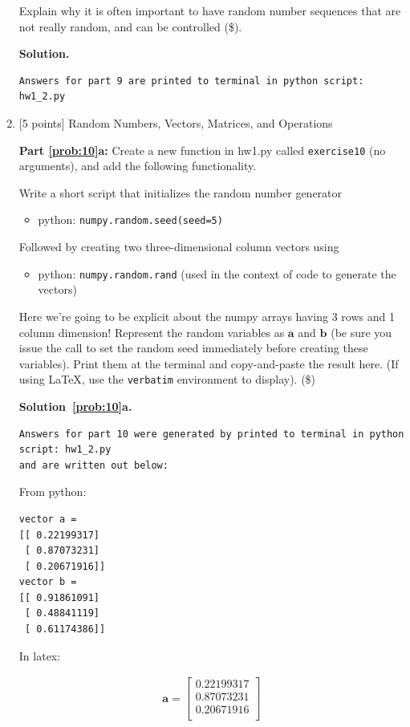 \documentclass[10pt]{article}
\begin{document}
\begin{enumerate}
Explain why it is often important to have random number sequences that are not really random, and can be controlled (\$).

{\bf Solution.}

\begin{verbatim}
Answers for part 9 are printed to terminal in python script: hw1_2.py
\end{verbatim}

\item \label{prob:10} [5 points] Random Numbers, Vectors, Matrices, and Operations

{\bf Part \ref{prob:10}a:} Create a new function in hw1.py called {\tt exercise10} (no arguments), and add the following functionality.

Write a short script that initializes the random number generator
\begin{itemize}
\item[] python: {\tt numpy.random.seed(seed=5)}
\end{itemize}
Followed by creating two three-dimensional column vectors using
\begin{itemize}
\item[] python: {\tt numpy.random.rand} (used in the context of code to generate the vectors)
\end{itemize}
Here we're going to be explicit about the numpy arrays having 3 rows and 1 column dimension!
Represent the random variables as $\mathbf{a}$ and $\mathbf{b}$ (be sure you issue the call to set the random seed immediately before creating these variables).  Print them at the terminal and copy-and-paste the result here. (If using \LaTeX, use the {\tt verbatim} environment to display). (\$)

{\bf Solution~\ref{prob:10}a.} 

\begin{verbatim}
Answers for part 10 were generated by printed to terminal in python script: hw1_2.py 
and are written out below:
\end{verbatim}

From python:
\begin{verbatim}
vector a = 
[[ 0.22199317]
 [ 0.87073231]
 [ 0.20671916]]
vector b = 
[[ 0.91861091]
 [ 0.48841119]
 [ 0.61174386]]
\end{verbatim}

In latex:

\begin{eqnarray*}
\mathbf{a} =
    \begin{bmatrix}
    0.22199317 \\[0.3em]
    0.87073231 \\[0.3em]
    0.20671916 \\[0.3em]
    \end{bmatrix}
\end{eqnarray*}


\end{enumerate}
\end{document}

